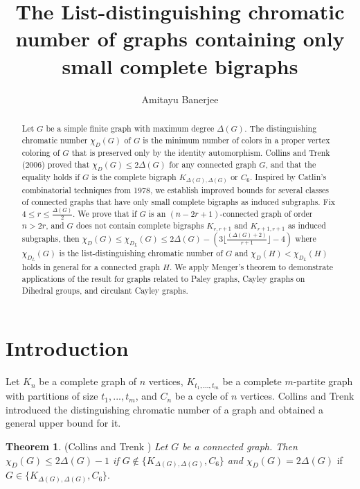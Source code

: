 \documentclass[12pt,reqno,a4paper]{amsart}
\title[The List-distinguishing chromatic number]{The List-distinguishing chromatic number of graphs containing only small complete bigraphs}
\author{Amitayu Banerjee}
\date{}
\theoremstyle{definition}
\newtheorem{thm}[defn]{Theorem}
\begin{document}
\begin{abstract}
Let $G$ be a simple finite graph with maximum degree $\Delta(G)$.
The distinguishing chromatic number $\chi_{D}(G)$ of $G$ is the minimum number of colors in a proper vertex coloring of $G$ that is preserved only by the identity automorphism. Collins and Trenk (2006) proved that $\chi_{D}(G)\leq 2 \Delta(G)$ for any connected graph $G$, and that the equality holds if $G$ is the complete bigraph $K_{\Delta(G),\Delta(G)}$ or $C_{6}$. 
Inspired by Catlin's combinatorial techniques from 1978, we establish improved bounds for several classes of connected graphs that have only small complete bigraphs as induced subgraphs.
Fix $4\leq r\leq \frac{\Delta(G)}{2}$.
We prove that if $G$ is an $(n-2r+1)$-connected graph of order $n>2r$, and 
$G$ does not contain complete bigraphs $K_{r,r+1}$ and $K_{r+1,r+1}$ as induced subgraphs, then $\chi_{D}(G)\leq \chi_{D_{L}}(G)\leq 2\Delta(G)- (3\lfloor\frac{(\Delta(G)+2)}{r+1}\rfloor-4)$ where $\chi_{D_{L}}(G)$ is the list-distinguishing chromatic number of $G$ and $\chi_{D}(H)<\chi_{D_{L}}(H)$ holds in general for a connected graph $H$. 
We apply Menger's theorem to demonstrate applications of the result for graphs related to Paley graphs, Cayley graphs on Dihedral groups, and circulant Cayley graphs.
\end{abstract}

\maketitle
\section{Introduction} 
Let $K_{n}$ be a complete graph of $n$ vertices, $K_{t_{1},...,t_{m}}$ be a complete $m$-partite graph with partitions of size $t_{1},...,t_{m}$, and $C_{n}$ be a cycle of $n$ vertices.
Collins and Trenk \cite{CT2006} introduced the distinguishing chromatic number of a graph and obtained a general upper bound for it.

\begin{thm}\label{Theorem 1.1}{(Collins and Trenk \cite[Theorem 4.5]{CT2006})}
{\em Let $G$ be a connected graph. Then $\chi_{D}(G)\leq 2\Delta(G)-1$ if $G\not\in\{K_{\Delta(G),\Delta(G)},C_{6}\}$ and $\chi_{D}(G) = 2\Delta(G)$} if $G\in\{K_{\Delta(G),\Delta(G)},C_{6}\}$.    
\end{thm}
\end{document}
